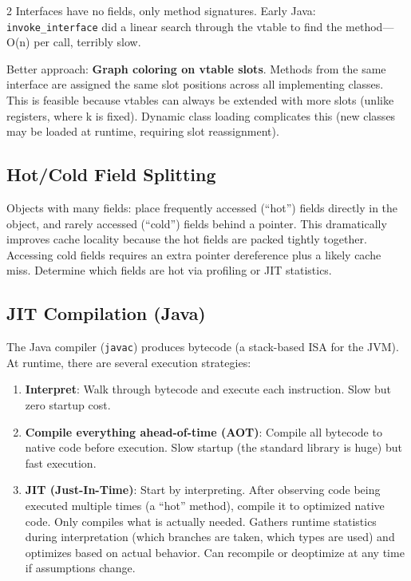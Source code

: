 \documentclass[9pt,landscape]{extarticle}
\begin{document}
\begin{multicols}{2}
Interfaces have no fields, only method signatures. Early Java: \texttt{invoke\_interface} did a linear search through the vtable to find the method---O(n) per call, terribly slow.

Better approach: \textbf{Graph coloring on vtable slots}. Methods from the same interface are assigned the same slot positions across all implementing classes. This is feasible because vtables can always be extended with more slots (unlike registers, where k is fixed). Dynamic class loading complicates this (new classes may be loaded at runtime, requiring slot reassignment).

\subsection{Hot/Cold Field Splitting}

Objects with many fields: place frequently accessed (``hot'') fields directly in the object, and rarely accessed (``cold'') fields behind a pointer. This dramatically improves cache locality because the hot fields are packed tightly together. Accessing cold fields requires an extra pointer dereference plus a likely cache miss. Determine which fields are hot via profiling or JIT statistics.

\subsection{JIT Compilation (Java)}

The Java compiler (\texttt{javac}) produces bytecode (a stack-based ISA for the JVM). At runtime, there are several execution strategies:
\begin{enumerate}
  \item \textbf{Interpret}: Walk through bytecode and execute each instruction. Slow but zero startup cost.
  \item \textbf{Compile everything ahead-of-time (AOT)}: Compile all bytecode to native code before execution. Slow startup (the standard library is huge) but fast execution.
  \item \textbf{JIT (Just-In-Time)}: Start by interpreting. After observing code being executed multiple times (a ``hot'' method), compile it to optimized native code. Only compiles what is actually needed. Gathers runtime statistics during interpretation (which branches are taken, which types are used) and optimizes based on actual behavior. Can recompile or deoptimize at any time if assumptions change.
\end{enumerate}


\end{multicols}
\end{document}
